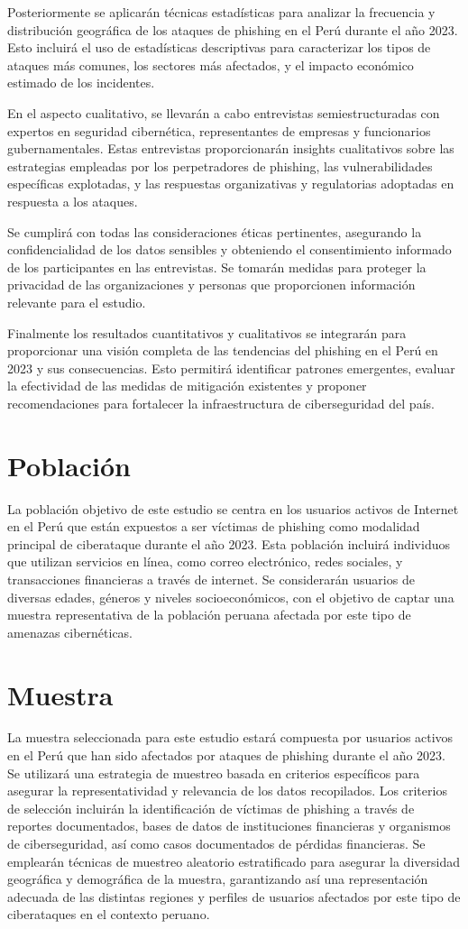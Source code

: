 Posteriormente se aplicarán técnicas estadísticas para analizar la frecuencia y distribución geográfica de los ataques de phishing en el Perú durante el año 2023. Esto incluirá el uso de estadísticas descriptivas para caracterizar los tipos de ataques más comunes, los sectores más afectados, y el impacto económico estimado de los incidentes.

En el aspecto cualitativo, se llevarán a cabo entrevistas semiestructuradas con expertos en seguridad cibernética, representantes de empresas y funcionarios gubernamentales. Estas entrevistas proporcionarán insights cualitativos sobre las estrategias empleadas por los perpetradores de phishing, las vulnerabilidades específicas explotadas, y las respuestas organizativas y regulatorias adoptadas en respuesta a los ataques.

Se cumplirá con todas las consideraciones éticas pertinentes, asegurando la confidencialidad de los datos sensibles y obteniendo el consentimiento informado de los participantes en las entrevistas. Se tomarán medidas para proteger la privacidad de las organizaciones y personas que proporcionen información relevante para el estudio.

Finalmente los resultados cuantitativos y cualitativos se integrarán para proporcionar una visión completa de las tendencias del phishing en el Perú en 2023 y sus consecuencias. Esto permitirá identificar patrones emergentes, evaluar la efectividad de las medidas de mitigación existentes y proponer recomendaciones para fortalecer la infraestructura de ciberseguridad del país.
\section{Población}
La población objetivo de este estudio se centra en los usuarios activos de Internet en el Perú que están expuestos a ser víctimas de phishing como modalidad principal de ciberataque durante el año 2023. Esta población incluirá individuos que utilizan servicios en línea, como correo electrónico, redes sociales, y transacciones financieras a través de internet. Se considerarán usuarios de diversas edades, géneros y niveles socioeconómicos, con el objetivo de captar una muestra representativa de la población peruana afectada por este tipo de amenazas cibernéticas.
\section{Muestra}
La muestra seleccionada para este estudio estará compuesta por usuarios activos en el Perú que han sido afectados por ataques de phishing durante el año 2023. Se utilizará una estrategia de muestreo basada en criterios específicos para asegurar la representatividad y relevancia de los datos recopilados. Los criterios de selección incluirán la identificación de víctimas de phishing a través de reportes documentados, bases de datos de instituciones financieras y organismos de ciberseguridad, así como casos documentados de pérdidas financieras. Se emplearán técnicas de muestreo aleatorio estratificado para asegurar la diversidad geográfica y demográfica de la muestra, garantizando así una representación adecuada de las distintas regiones y perfiles de usuarios afectados por este tipo de ciberataques en el contexto peruano.
